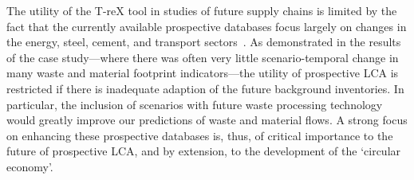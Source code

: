 The utility of the T-reX tool in studies of future supply chains is limited by the fact that the currently available prospective databases focus largely on changes in the energy, steel, cement, and transport sectors~\citep{sacchi2023premisedocs}. As demonstrated in the results of the case study---where there was often very little scenario-temporal change in many waste and material footprint indicators---the utility of prospective LCA is restricted if there is inadequate adaption of the future background inventories. In particular, the inclusion of scenarios with future waste processing technology would greatly improve our predictions of waste and material flows\citep{bisinella2024wastelca}. A strong focus on enhancing these prospective databases is, thus, of critical importance to the future of prospective LCA, and by extension, to the development of the `circular economy'. 
